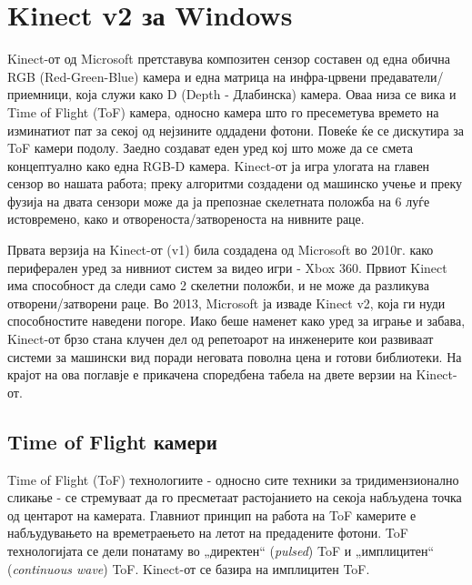 \documentclass[12pt]{article}
\begin{document}
\newpage

\section{Kinect v2 за Windows}
	Kinect-от од Microsoft претставува композитен сензор составен од една обична RGB (Red-Green-Blue) камера и една матрица на инфра-црвени предаватели/приемници, која служи како D (Depth - Длабинска) камера. Оваа низа се вика и Time of Flight (ToF) камера, односно камера што го пресеметува времето на изминатиот пат за секој од нејзините оддадени фотони. Повеќе ќе се дискутира за ToF камери подолу. Заедно создават еден уред кој што може да се смета концептуално како една RGB-D камера. Kinect-от ја игра улогата на главен сензор во нашата работа; преку алгоритми создадени од машинско учење и преку фузија на двата сензори може да ја препознае скелетната положба на 6 луѓе истовремено, како и отвореноста/затвореноста на нивните раце.

	Првата верзија на Kinect-от (v1) била создадена од Microsoft во 2010г. како периферален уред за нивниот систем за видео игри - Xbox 360. Првиот Kinect има способност да следи само 2 скелетни положби, и не може да разликува отворени/затворени раце. Во 2013, Microsoft ја изваде Kinect v2, која ги нуди способностите наведени погоре. Иако беше наменет како уред за играње и забава, Kinect-от брзо стана клучен дел од репетоарот на инженерите кои развиваат системи за машински вид поради неговата поволна цена и готови библиотеки. На крајот на ова поглавје е прикачена споредбена табела на двете верзии на Kinect-от.

  \subsection{Time of Flight камери}
  	Time of Flight (ToF) технологиите - односно сите техники за тридимензионално сликање - се стремуваат да го пресметаат растојанието на секоја набљудена точка од центарот на камерата. Главниот принцип на работа на ToF камерите е набљудувањето на времетраењето на летот на предадените фотони. ToF технологијата се дели понатаму во „директен“ (\textit{pulsed}) ToF и „имплицитен“ (\textit{continuous wave}) ToF. Kinect-от се базира на имплицитен ToF.
\end{document}
